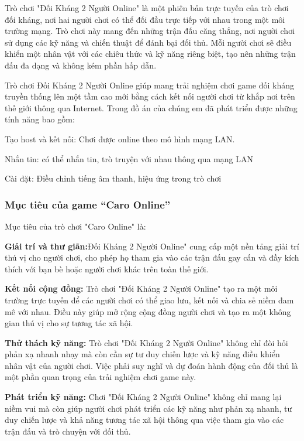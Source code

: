 \documentclass[a4paper]{article}
\begin{document}
Trò chơi "Đối Kháng 2 Người Online" là một phiên bản trực tuyến của trò chơi đối kháng, nơi hai người chơi có thể đối đầu trực tiếp với nhau trong một môi trường mạng. Trò chơi này mang đến những trận đấu căng thẳng, nơi người chơi sử dụng các kỹ năng và chiến thuật để đánh bại đối thủ. Mỗi người chơi sẽ điều khiển một nhân vật với các chiêu thức và kỹ năng riêng biệt, tạo nên những trận đấu đa dạng và không kém phần hấp dẫn.

Trò chơi Đối Kháng 2 Người Online giúp mang trải nghiệm chơi game đối kháng truyền thống lên một tầm cao mới bằng cách kết nối người chơi từ khắp nơi trên thế giới thông qua Internet. Trong đồ án của chúng em đã phát triển được những tính năng bao gồm:

Tạo host và kết nối: Chơi được online theo mô hình mạng LAN.

Nhắn tin: có thể nhắn tin, trò truyện với nhau thông qua mạng LAN

Cài đặt: Điều chỉnh tiếng âm thanh, hiệu ứng trong trò chơi

\hypertarget{mux1ee5c-tiuxeau-cux1ee7a-game-caro-online}{%
\subsubsection{Mục tiêu của game ``Caro
Online''}\label{mux1ee5c-tiuxeau-cux1ee7a-game-caro-online}}

Mục tiêu của trò chơi "Caro Online" là:

\textbf{Giải trí và thư giãn:}Đối Kháng 2 Người Online" cung cấp một nền tảng giải trí thú vị cho người chơi, cho phép họ tham gia vào các trận đấu gay cấn và đầy kích thích với bạn bè hoặc người chơi khác trên toàn thế giới.

\textbf{Kết nối cộng đồng:} Trò chơi "Đối Kháng 2 Người Online" tạo ra một môi trường trực tuyến để các người chơi có thể giao lưu, kết nối và chia sẻ niềm đam mê với nhau. Điều này giúp mở rộng cộng đồng người chơi và tạo ra một không gian thú vị cho sự tương tác xã hội.

\textbf{Thử thách kỹ năng:} Trò chơi "Đối Kháng 2 Người Online" không chỉ đòi hỏi phản xạ nhanh nhạy mà còn cần sự tư duy chiến lược và kỹ năng điều khiển nhân vật của người chơi. Việc phải suy nghĩ và dự đoán hành động của đối thủ là một phần quan trọng của trải nghiệm chơi game này.

\textbf{Phát triển kỹ năng:} Chơi "Đối Kháng 2 Người Online" không chỉ mang lại niềm vui mà còn giúp người chơi phát triển các kỹ năng như phản xạ nhanh, tư duy chiến lược và khả năng tương tác xã hội thông qua việc tham gia vào các trận đấu và trò chuyện với đối thủ.
\end{document}
